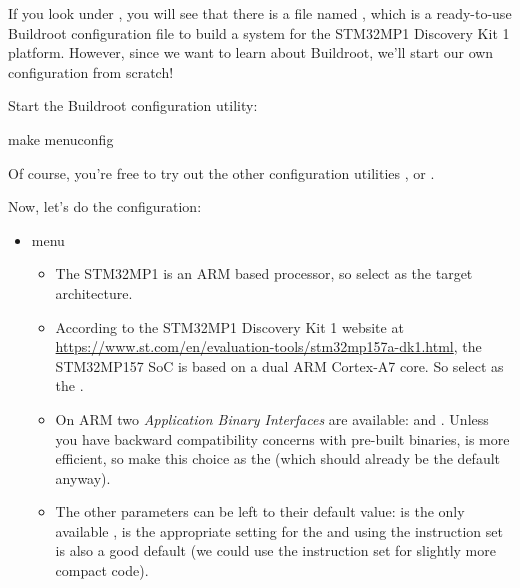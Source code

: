 If you look under , you will see that there is a file
named , which is a ready-to-use Buildroot
configuration file to build a system for the STM32MP1 Discovery Kit 1
platform. However, since we want to learn about Buildroot, we'll start
our own configuration from scratch!

Start the Buildroot configuration utility:

\begin{bashinput}
make menuconfig
\end{bashinput}

Of course, you're free to try out the other configuration utilities
,  or .

Now, let's do the configuration:

\begin{itemize}

\item {} menu

  \begin{itemize}

  \item The STM32MP1 is an ARM based processor, so select  as the target architecture.

  \item According to the STM32MP1 Discovery Kit 1 website at
    \url{https://www.st.com/en/evaluation-tools/stm32mp157a-dk1.html},
    the STM32MP157 SoC is based on a dual ARM Cortex-A7 core. So
    select  as the .

  \item On ARM two {\em Application Binary Interfaces} are available:
     and . Unless you have backward
    compatibility concerns with pre-built binaries,  is
    more efficient, so make this choice as the 
    (which should already be the default anyway).

  \item The other parameters can be left to their default value:
     is the only available ,
     is the appropriate setting for the  and using the  instruction set is also
    a good default (we could use the  instruction set
    for slightly more compact code).

  \end{itemize}


\end{itemize}
